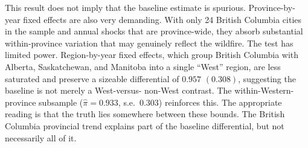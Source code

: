 \documentclass[12pt]{article}
\begin{document}
This result does not imply that the baseline estimate is spurious. Province-by-year
fixed effects are also very demanding. With only 24 British Columbia cities in
the sample and annual shocks that are province-wide, they absorb substantial
within-province variation that may genuinely reflect the wildfire. The test has limited power.
Region-by-year fixed effects, which group British Columbia with Alberta, Saskatchewan,
and Manitoba into a single ``West'' region, are less saturated and preserve a sizeable
differential of $0.957$ $(0.308)$, suggesting the baseline is not merely a West-versus-
non-West contrast. The within-Western-province subsample ($\hat{\pi}=0.933$, s.e.\ $0.303$)
reinforces this. The appropriate reading is that the truth lies somewhere between
these bounds. The British Columbia provincial trend explains part of the baseline
differential, but not necessarily all of it.
\end{document}

